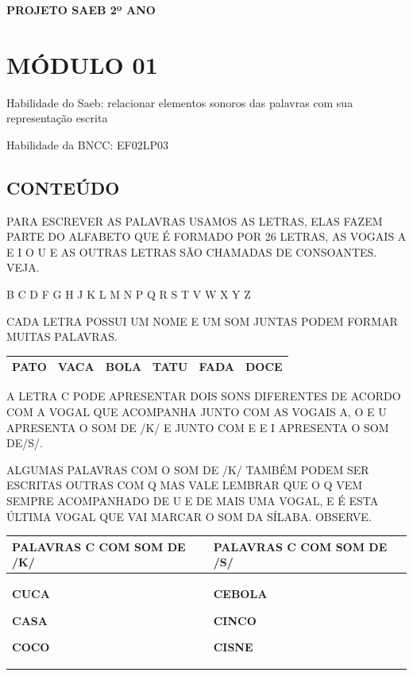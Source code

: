 \protect\hypertarget{_Hlk129609903}{}{}\textbf{PROJETO SAEB 2º ANO}

\section{MÓDULO 01}\label{muxf3dulo-01}

\protect\hypertarget{_Hlk129109425}{}{}Habilidade do Saeb: relacionar
elementos sonoros das palavras com sua representação escrita

Habilidade da BNCC: EF02LP03

\subsection{CONTEÚDO}\label{conteuxfado}

PARA ESCREVER AS PALAVRAS USAMOS AS LETRAS, ELAS FAZEM PARTE DO ALFABETO
QUE É FORMADO POR 26 LETRAS, AS VOGAIS A E I O U E AS OUTRAS LETRAS SÃO
CHAMADAS DE CONSOANTES. VEJA.

B C D F G H J K L M N P Q R S T V W X Y Z

CADA LETRA POSSUI UM NOME E UM SOM JUNTAS PODEM FORMAR MUITAS PALAVRAS.

\begin{longtable}[]{@{}llllll@{}}
\toprule
\textbf{PATO} & \textbf{VACA} & \textbf{BOLA} & \textbf{TATU} &
\textbf{FADA} & \textbf{DOCE}\tabularnewline
\bottomrule
\end{longtable}

A LETRA C PODE APRESENTAR DOIS SONS DIFERENTES DE ACORDO COM A VOGAL QUE
ACOMPANHA JUNTO COM AS VOGAIS A, O E U APRESENTA O SOM DE /K/ E JUNTO
COM E E I APRESENTA O SOM DE/S/.

ALGUMAS PALAVRAS COM O SOM DE /K/ TAMBÉM PODEM SER ESCRITAS OUTRAS COM Q
MAS VALE LEMBRAR QUE O Q VEM SEMPRE ACOMPANHADO DE U E DE MAIS UMA
VOGAL, E É ESTA ÚLTIMA VOGAL QUE VAI MARCAR O SOM DA SÍLABA. OBSERVE.

\begin{longtable}[]{@{}ll@{}}
\toprule
\textbf{PALAVRAS C COM SOM DE /K/} & \textbf{PALAVRAS C COM SOM DE
/S/}\tabularnewline
\midrule
\endhead
\begin{minipage}[t]{0.48\columnwidth}\raggedright\strut
\textbf{CUCA}

\textbf{CASA }

\textbf{COCO }\strut
\end{minipage} & \begin{minipage}[t]{0.48\columnwidth}\raggedright\strut
\textbf{CEBOLA}

\textbf{CINCO}

\textbf{CISNE}\strut
\end{minipage}\tabularnewline
\bottomrule
\end{longtable}

